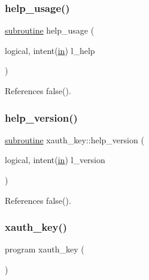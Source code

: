 \subsubsection{\texorpdfstring{help\+\_\+usage()}{help\_usage()}}
{\footnotesize\ttfamily \hyperlink{M__stopwatch_83_8txt_acfbcff50169d691ff02d4a123ed70482}{subroutine} help\+\_\+usage (\begin{DoxyParamCaption}\item[{logical, intent(\hyperlink{M__journal_83_8txt_afce72651d1eed785a2132bee863b2f38}{in})}]{l\+\_\+help }\end{DoxyParamCaption})}



References false().

\mbox{\label{xauth__key_8f90_ad2aaabc58e93e13e8a0d5acf843eb5d0}} 
\subsubsection{\texorpdfstring{help\+\_\+version()}{help\_version()}}
{\footnotesize\ttfamily \hyperlink{M__stopwatch_83_8txt_acfbcff50169d691ff02d4a123ed70482}{subroutine} xauth\+\_\+key\+::help\+\_\+version (\begin{DoxyParamCaption}\item[{logical, intent(\hyperlink{M__journal_83_8txt_afce72651d1eed785a2132bee863b2f38}{in})}]{l\+\_\+version }\end{DoxyParamCaption})}



References false().

\mbox{\label{xauth__key_8f90_a0f9a35aa83e47ebe911d6c02ac4f5798}} 
\subsubsection{\texorpdfstring{xauth\+\_\+key()}{xauth\_key()}}
{\footnotesize\ttfamily program xauth\+\_\+key (\begin{DoxyParamCaption}{ }\end{DoxyParamCaption})}



